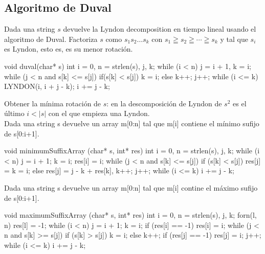 \documentclass[10pt,landscape,twocolumn,a4paper,notitlepage]{article}
\begin{document}
\subsection{Algoritmo de Duval}
    Dada una string $s$ devuelve la Lyndon decomposition en tiempo lineal usando el algoritmo de Duval.
    Factoriza $s$ como $s_1 s_2 \ldots s_k$ con $s_1 \geqq s_2 \geqq \cdots \geqq s_k$ y tal que $s_i$ es Lyndon, esto es, es su menor rotaci\'on.
\begin{code}
void duval(char* s) {   
    int i = 0, n = strlen(s), j, k;
    while (i < n) {
        j = i + 1, k = i;
        while (j < n and s[k] <= s[j]) {
            if(s[k] < s[j]) k = i; else k++; j++; }
        while (i <= k) {
        		LYNDON(i, i + j - k); i += j - k; }}}
\end{code}
\noindent Obtener la m\'inima rotaci\'on de $s$: en la descomposici\'on de Lyndon de $s^2$ es el \'ultimo $i<|s|$ con el que empieza una Lyndon.\\
\noindent Dada una string s devuelve un array m[0:n] tal que m[i] contiene el m\'inimo sufijo de s[0:i+1].
\begin{code}
void minimumSuffixArray (char* s, int* res) {
    int i = 0, n = strlen(s), j, k;
    while (i < n) {
        j = i + 1; k = i; res[i] = i;
        while (j < n and s[k] <= s[j]) {
            if (s[k] < s[j]) res[j] = k = i;
            else res[j] = j - k + res[k], k++; j++; }
        while (i <= k) i += j - k; }}
\end{code}
\noindent Dada una string s devuelve un array m[0:n] tal que m[i] contine el m\'aximo sufijo de s[0:i+1].
\begin{code}
void maximumSuffixArray (char* s, int* res) {
    int i = 0, n = strlen(s), j, k; forn(l, n) res[l] = -1;
    while (i < n) {
        j = i + 1; k = i;
        if (res[i] == -1) res[i] = i;
        while (j < n and s[k] >= s[j]) {
            if (s[k] > s[j]) k = i; else k++;
            if (res[j] == -1) res[j] = i; j++; }
        while (i <= k) i += j - k; }}
\end{code}
\end{document}
